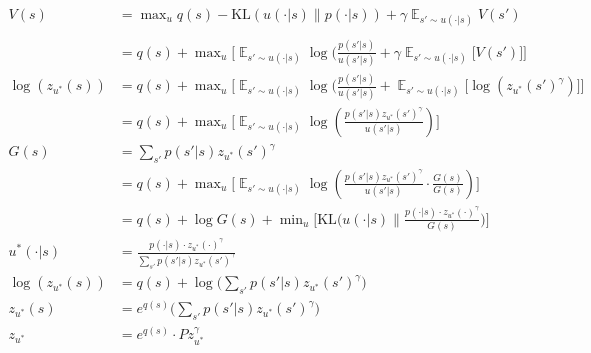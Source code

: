 \begin{align*}
V(s) &= \mathop{\text{max}}_{u} q(s) - \text{KL}(u(\cdot| s) \parallel p(\cdot | s)) + \gamma \mathop{\mathbb E}_{s' \sim u(\cdot | s)} V(s') \tag{1}\\
\\
&= q(s) + \mathop{\text{max}}_{u} \bigg[ \mathop{\mathbb E}_{s' \sim u(\cdot | s)} \log(\frac{p(s' | s) }{ u(s' | s)}+\gamma \mathop{\mathbb E}_{s' \sim u(\cdot | s)} \big[V(s')\big] \bigg] \tag{2}\\
\log(z_{u^{* }}(s)) &= q(s) + \mathop{\text{max}}_{u} \bigg[ \mathop{\mathbb E}_{s' \sim u(\cdot | s)} \log(\frac{p(s' | s) }{ u(s' | s)}+\mathop{\mathbb E}_{s' \sim u(\cdot | s)} \big[\log(z_{u^{* }}(s')^{\gamma})\big] \bigg] \tag{3}\\
&= q(s) + \mathop{\text{max}}_{u} \bigg[ \mathop{\mathbb E}_{s' \sim u(\cdot | s)} \log(\frac{p(s' | s)z_{u^{* }}(s')^{\gamma} }{ u(s' | s)} ) \bigg] \tag{4}\\
G(s) &= \sum_{s'} p(s' | s) z_{u^{* }}(s')^{\gamma} \tag{5}\\
&= q(s) + \mathop{\text{max}}_{u} \bigg[ \mathop{\mathbb E}_{s' \sim u(\cdot | s)} \log(\frac{p(s' | s)z_{u^{* }}(s')^{\gamma} }{ u(s' | s)} \cdot \frac{G(s)}{G(s)} ) \bigg] \tag{6}\\
&= q(s) + \log G(s) + \mathop{\text{min}}_{u} \bigg[\text{KL}\big(u(\cdot | s) \parallel \frac{p(\cdot | s)\cdot z_{u^{* }}(\cdot)^{\gamma}}{G(s)} \big) \bigg] \tag{7}\\
u^{* }(\cdot | s) &= \frac{p(\cdot | s)\cdot z_{u^{* }}(\cdot)^{\gamma}}{\sum_{s'} p(s' | s) z_{u^{* }}(s')^{\gamma}} \tag{8}\\
\log(z_{u^{* }}(s)) &= q(s) + \log \big(\sum_{s'} p(s' | s) z_{u^{* }}(s')^{\gamma}\big) \tag{9}\\
z_{u^{* }}(s) &= e^{q(s)}\big(\sum_{s'} p(s' | s) z_{u^{* }}(s')^{\gamma}\big) \tag{10}\\
z_{u^{* }} &= e^{q(s)}\cdot P z_{u^{* }}^{\gamma} \tag{11}\\
\end{align*}

